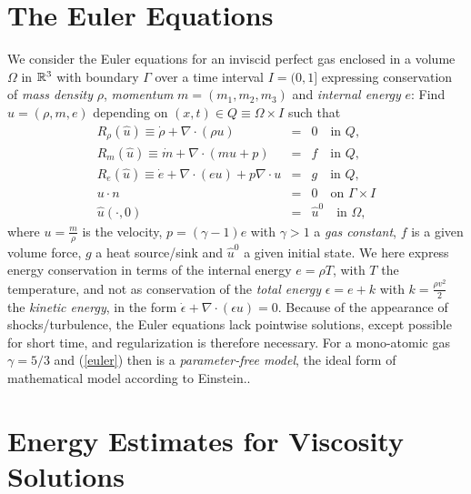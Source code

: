\section{The Euler Equations}
We consider the Euler equations for an inviscid perfect gas 
enclosed in a volume $\Omega$ in ${\Bbb{R}}^3$ with boundary $\Gamma$
over a time interval $I=(0,1]$ expressing conservation of
\emph{mass density} $\rho$, \emph{momentum} $m=(m_1,m_2,m_3)$ and 
\emph{internal energy} $e$: 
Find $\hat u=(\rho ,m,e)$ 
depending on $(x,t)\in Q\equiv \Omega\times I$ such that
\begin{equation}\label{euler}
\begin{array}{rcl}
R_\rho (\hat u)\equiv\dot \rho +\nabla\cdot (\rho u )&=&  0 \quad \mbox{in } Q,
\\
R_m(\hat u)\equiv\dot m +\nabla\cdot (mu +p)&=&  f \quad \mbox{in } Q, \\
R_e(\hat u)\equiv\dot e +\nabla\cdot (eu)+p\nabla\cdot u &=& g  \quad \mbox{in }
Q,\\ 
u\cdot n&=&0\quad \mbox{on } \Gamma\times I\\
\hat u(\cdot ,0)&=&\hat u^0\quad \mbox{in } \Omega , 
\end{array} 
\end{equation}
where $u=\frac{m}{\rho}$ is the velocity, 
$p=(\gamma -1)e$ with $\gamma >1$ a \emph{gas constant},
$f$ is a given volume force, $g$ a heat source/sink and $\hat u^0$
a given initial state. We here express
energy conservation in terms of the internal energy $e=\rho T$, 
with $T$ the temperature, and not
as conservation of the \emph{total energy} 
$\epsilon =e+k$ with $k=\frac{\rho v^2}{2}$ the \emph{kinetic energy},
in the form $\dot\epsilon +\nabla\cdot (\epsilon u)= 0$. Because
of the appearance of shocks/turbulence, the Euler equations lack
pointwise solutions, except possible for short time, and
regularization is therefore necessary. For a mono-atomic gas
$\gamma =5/3$ and (\ref{euler}) then is a \emph{parameter-free model},
the ideal form of mathematical model according to Einstein..   



\section{Energy Estimates for Viscosity Solutions}

